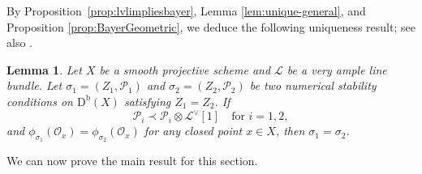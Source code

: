 \documentclass[11pt, reqno]{amsart}
\numberwithin{equation}{section}
\theoremstyle{plain}
\newtheorem{lemma}[theorem]{Lemma}
\theoremstyle{remark}
\theoremstyle{definition}
\theoremstyle{italicsname}
\newcommand{\Db}{\mathrm{D^b}}
\newcommand{\Coh}{\mathrm{Coh}}
\DeclareMathOperator{\Ext}{Ext}
\newcommand{\cO}{\mathcal{O}}
\newcommand{\cH}{\mathcal{H}}
\newcommand{\cL}{\mathcal{L}}
\newcommand{\cP}{\mathscr{P}}
\begin{document}
By Proposition~\ref{prop:lvlimpliesbayer}, Lemma \ref{lem:unique-general}, and Proposition \ref{prop:BayerGeometric}, we deduce the following uniqueness result; see also \cite[Corollary 6.13]{Li:sb}.

\begin{lemma}\label{lem:unique-Bayer}
Let $X$ be a smooth projective scheme and $\cL$ be a very ample line bundle. 
Let $\sigma_1=(Z_1, \cP_1)$ and $\sigma_2=(Z_2, \cP_2)$ be two numerical stability conditions on $\Db(X)$ satisfying $Z_{1}=Z_{2}$. 
If 
\[
\cP_i\prec\cP_i\otimes\cL^{\vee}[1] \quad \text{for } i=1,2,
\]
and $\phi_{\sigma_1}(\cO_x)=\phi_{\sigma_2}(\cO_x)$ for any closed point $x\in X$, then $\sigma_1=\sigma_2$.
\end{lemma}

We can now prove the main result for this section.
\end{document}
